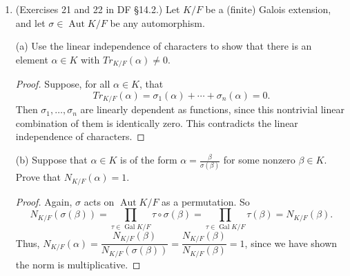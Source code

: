 \documentclass[10pt]{article}
\DeclareMathOperator*{\Aut}{Aut}
\DeclareMathOperator*{\Gal}{Gal}
\begin{document}
\begin{enumerate}
\begin{proof}
Since $K$ is Galois and $m_{\alpha}(x)$ is irreducible, $m_{\alpha}$ must be separable with $d$ distinct roots $\alpha = \alpha_1, \dots , \alpha_d$ in $K$.  Let $E$ be the splitting field for $m_{\alpha}(x)$ over $F$, so that $F \subset E \subset K$.  Then $E$ is also a Galois extension with Galois group $H$ of order $d$, which is isomorphic to the quotient $\Gal(K/F) / \Gal(K / H)$.  Thus the cosets of $\Gal(K/H)$ in $\Gal(K/F)$ each have size $n/d$, and two automorphisms from $\Gal(K/F)$ have the same action on $E$ if and only if they are in the same coset of $\Gal(K/H)$.  Thus, for each root $\alpha_i$, there are exactly $n/d$ automorphisms in $\Gal(K/F)$ which map $\alpha$ to $\alpha_i$.  Therefore,
$$
Tr_{K/F}(\alpha) = \frac{n}{d}(\alpha_1 + \cdots + \alpha_d).
$$
Now, we know that $m_{\alpha}(x) = (x-\alpha_1) \cdots (x-\alpha_d)$.  The ways to make terms containing a factor of degree $d-1$ are to take $-\alpha_i$ from one factor, and take $x$ from every other factor when distributing.  Thus $a_{d-1} = -\alpha_1 - \cdots - \alpha_d = -(\alpha_1 + \cdots + \alpha_d)$.  So $Tr_{K/F}(\alpha) = -\frac{n}{d}a_{d-1}$.
\end{proof}

\item (Exercises 21 and 22 in DF \S 14.2.) Let $K/F$ be a (finite) Galois extension, and let $\sigma \in \Aut K/F$ be any automorphism.

(a) Use the linear independence of characters to show that there is an element $\alpha \in K$ with $Tr_{K/F}(\alpha) \neq 0$.

\begin{proof}
Suppose, for all $\alpha \in K$, that
$$
Tr_{K/F}(\alpha) = \sigma_1(\alpha) + \cdots + \sigma_n(\alpha) = 0.
$$
Then $\sigma_1, \dots , \sigma_n$ are linearly dependent as functions, since this nontrivial linear combination of them is identically zero.  This contradicts the linear independence of characters.
\end{proof}

(b) Suppose that $\alpha \in K$ is of the form $\alpha = \frac{\beta}{\sigma(\beta)}$ for some nonzero $\beta \in K$.  Prove that $N_{K/F}(\alpha)=1$.

\begin{proof}
Again, $\sigma$ acts on $\Aut K/F$ as a permutation.  So
$$N_{K/F}(\sigma(\beta)) = \prod_{\tau \in \Gal K/F} \tau \circ \sigma(\beta) = \prod_{\tau \in \Gal K/F} \tau (\beta) = N_{K/F}(\beta).$$
Thus, $N_{K/F}(\alpha) = \dfrac{N_{K/F}(\beta)}{N_{K/F}(\sigma(\beta))} = \dfrac{N_{K/F}(\beta)}{N_{K/F}(\beta)} = 1$, since we have shown the norm is multiplicative.
\end{proof}


\end{enumerate}
\end{document}
